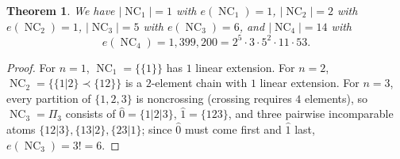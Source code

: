 \documentclass[11pt]{article}
\newtheorem{theorem}{Theorem}[section]
\theoremstyle{definition}
\newcommand{\NC}{\operatorname{NC}}
\begin{document}
\begin{theorem}\label{thm:nc4}
We have $|\NC_1| = 1$ with $e(\NC_1) = 1$, $|\NC_2| = 2$ with $e(\NC_2) = 1$,
$|\NC_3| = 5$ with $e(\NC_3) = 6$, and $|\NC_4| = 14$ with
\[
  e(\NC_4) = 1{,}399{,}200 = 2^5 \cdot 3 \cdot 5^2 \cdot 11 \cdot 53.
\]
\end{theorem}

\begin{proof}
For $n = 1$, $\NC_1 = \{\{1\}\}$ has $1$ linear extension. For $n = 2$,
$\NC_2 = \{\{1|2\} \prec \{12\}\}$ is a $2$-element chain with $1$ linear extension.
For $n = 3$, every partition of $\{1, 2, 3\}$ is noncrossing (crossing requires $4$
elements), so $\NC_3 = \Pi_3$ consists of $\hat{0} = \{1|2|3\}$, $\hat{1} = \{123\}$, and
three pairwise incomparable atoms $\{12|3\}, \{13|2\}, \{23|1\}$; since $\hat{0}$ must
come first and $\hat{1}$ last, $e(\NC_3) = 3! = 6$.


\end{proof}
\end{document}
